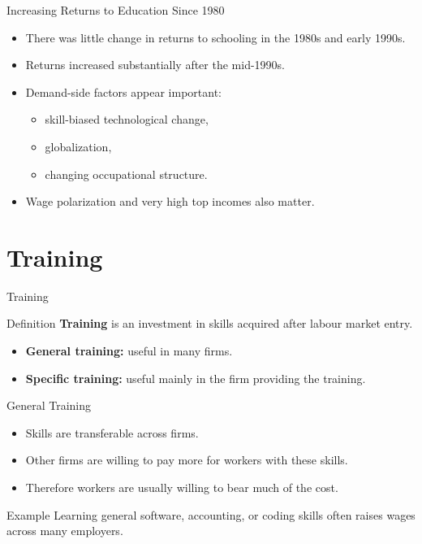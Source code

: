 \documentclass[aspectratio=169]{beamer}
\begin{document}
\begin{frame}{Increasing Returns to Education Since 1980}
\transfade
\begin{itemize}[<+->]
  \item There was little change in returns to schooling in the 1980s and early 1990s.
  \item Returns increased substantially after the mid-1990s.
  \item Demand-side factors appear important:
  \begin{itemize}[<+->]
    \item skill-biased technological change,
    \item globalization,
    \item changing occupational structure.
  \end{itemize}
  \item Wage polarization and very high top incomes also matter.
\end{itemize}
\end{frame}

\section{Training}

\begin{frame}{Training}
\transfade
\begin{block}{Definition}
\textbf{Training} is an investment in skills acquired after labour market entry.
\end{block}
\begin{itemize}[<+->]
  \item \textbf{General training:} useful in many firms.
  \item \textbf{Specific training:} useful mainly in the firm providing the training.
\end{itemize}
\end{frame}

\begin{frame}{General Training}
\transfade
\begin{itemize}[<+->]
  \item Skills are transferable across firms.
  \item Other firms are willing to pay more for workers with these skills.
  \item Therefore workers are usually willing to bear much of the cost.
\end{itemize}

\begin{exampleblock}{Example}
Learning general software, accounting, or coding skills often raises wages across many employers.
\end{exampleblock}
\end{frame}
\end{document}
